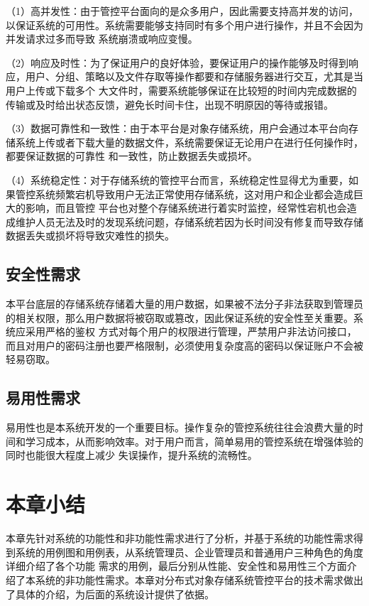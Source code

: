 （1）高并发性：由于管控平台面向的是众多用户，因此需要支持高并发的访问，以保证系统的可用性。系统需要能够支持同时有多个用户进行操作，并且不会因为并发请求过多而导致
系统崩溃或响应变慢。

（2）响应及时性：为了保证用户的良好体验，要保证用户的操作能够及时得到响应，用户、分组、策略以及文件存取等操作都要和存储服务器进行交互，尤其是当用户上传或下载多个
大文件时，需要系统能够保证在比较短的时间内完成数据的传输或及时给出状态反馈，避免长时间卡住，出现不明原因的等待或报错。

（3）数据可靠性和一致性：由于本平台是对象存储系统，用户会通过本平台向存储系统上传或者下载大量的数据文件，系统需要保证无论用户在进行任何操作时，都要保证数据的可靠性
和一致性，防止数据丢失或损坏。

（4）系统稳定性：对于存储系统的管控平台而言，系统稳定性显得尤为重要，如果管控系统频繁宕机导致用户无法正常使用存储系统，这对用户和企业都会造成巨大的影响，而且管控
平台也对整个存储系统进行着实时监控，经常性宕机也会造成维护人员无法及时的发现系统问题，存储系统若因为长时间没有修复而导致存储数据丢失或损坏将导致灾难性的损失。


\subsection{安全性需求}

本平台底层的存储系统存储着大量的用户数据，如果被不法分子非法获取到管理员的相关权限，那么用户数据将被窃取或篡改，因此保证系统的安全性至关重要。系统应采用严格的鉴权
方式对每个用户的权限进行管理，严禁用户非法访问接口，而且对用户的密码注册也要严格限制，必须使用复杂度高的密码以保证账户不会被轻易窃取。

\subsection{易用性需求}

易用性也是本系统开发的一个重要目标。操作复杂的管控系统往往会浪费大量的时间和学习成本，从而影响效率。对于用户而言，简单易用的管控系统在增强体验的同时也能很大程度上减少
失误操作，提升系统的流畅性。

\section{本章小结}

本章先针对系统的功能性和非功能性需求进行了分析，并基于系统的功能性需求得到系统的用例图和用例表，从系统管理员、企业管理员和普通用户三种角色的角度详细介绍了各个功能
需求的用例，最后分别从性能、安全性和易用性三个方面介绍了本系统的非功能性需求。本章对分布式对象存储系统管控平台的技术需求做出了具体的介绍，为后面的系统设计提供了依据。